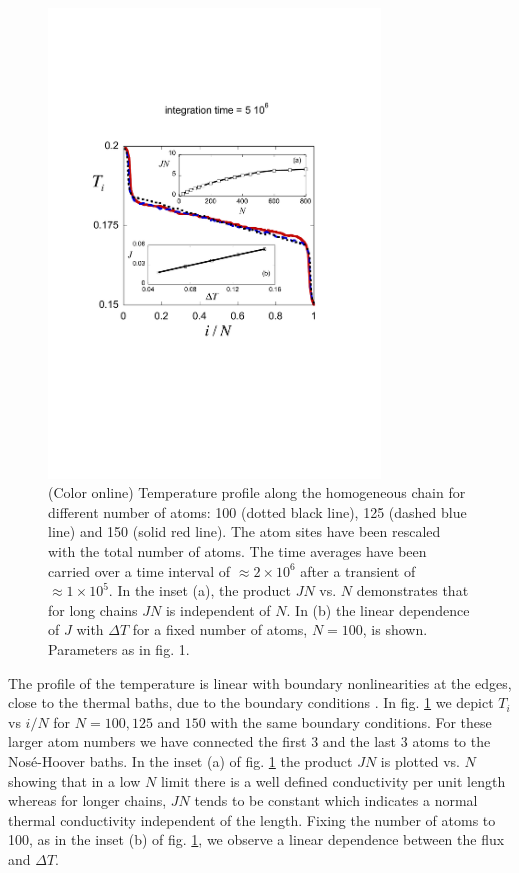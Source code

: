 \begin{figure}
\centering
\includegraphics[width=8.8cm]{Figures/FIG3.pdf}
\caption{(Color online) Temperature profile along the homogeneous chain for different number of atoms: 100 (dotted black line), 125 (dashed blue line) and 150 (solid red line). The atom sites have been rescaled with the total number of atoms.
The time averages have been carried over a time interval of $\approx 2 \times 10^6$ after a transient of $\approx 1\times 10^5$. In the inset (a), the product $JN$ vs. $N$ demonstrates that for long chains $JN$ is independent of $N$. In (b) the linear dependence of $J$ with $\Delta T$ for a fixed number of atoms, $N=100$, is shown. Parameters as in fig. 1.}
\label{figure3}
\end{figure}

The profile of the temperature is linear with boundary nonlinearities at the edges, close to the thermal baths,  due to the boundary conditions \cite{Lepri1997}. In fig. \ref{figure3} we depict $T_i$ vs $i/N$ for $N=100, 125$ and $150$ with the same boundary conditions. For these
larger atom numbers  we have connected the first 3 and the last 3 atoms to the Nos\'e-Hoover baths.
In the inset (a) of fig. \ref{figure3}  the product $JN$ is plotted vs. $N$ showing that in a low $N$ limit there is a well defined conductivity per unit length whereas for longer chains, $JN$ tends to be constant  which indicates a normal thermal conductivity independent of the length. Fixing the number of atoms to 100, as in the inset (b) of fig. \ref{figure3},  we observe a linear dependence between the flux and $\Delta T$.

